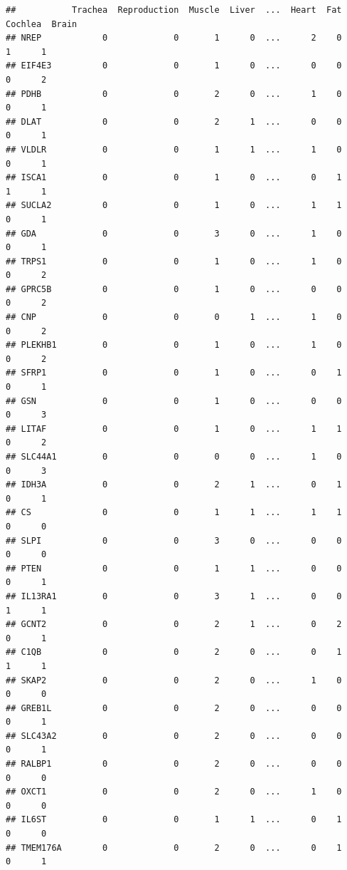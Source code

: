 \documentclass[
]{article}
\begin{document}
\begin{verbatim}
##           Trachea  Reproduction  Muscle  Liver  ...  Heart  Fat  Cochlea  Brain
## NREP            0             0       1      0  ...      2    0        1      1
## EIF4E3          0             0       1      0  ...      0    0        0      2
## PDHB            0             0       2      0  ...      1    0        0      1
## DLAT            0             0       2      1  ...      0    0        0      1
## VLDLR           0             0       1      1  ...      1    0        0      1
## ISCA1           0             0       1      0  ...      0    1        1      1
## SUCLA2          0             0       1      0  ...      1    1        0      1
## GDA             0             0       3      0  ...      1    0        0      1
## TRPS1           0             0       1      0  ...      1    0        0      2
## GPRC5B          0             0       1      0  ...      0    0        0      2
## CNP             0             0       0      1  ...      1    0        0      2
## PLEKHB1         0             0       1      0  ...      1    0        0      2
## SFRP1           0             0       1      0  ...      0    1        0      1
## GSN             0             0       1      0  ...      0    0        0      3
## LITAF           0             0       1      0  ...      1    1        0      2
## SLC44A1         0             0       0      0  ...      1    0        0      3
## IDH3A           0             0       2      1  ...      0    1        0      1
## CS              0             0       1      1  ...      1    1        0      0
## SLPI            0             0       3      0  ...      0    0        0      0
## PTEN            0             0       1      1  ...      0    0        0      1
## IL13RA1         0             0       3      1  ...      0    0        1      1
## GCNT2           0             0       2      1  ...      0    2        0      1
## C1QB            0             0       2      0  ...      0    1        1      1
## SKAP2           0             0       2      0  ...      1    0        0      0
## GREB1L          0             0       2      0  ...      0    0        0      1
## SLC43A2         0             0       2      0  ...      0    0        0      1
## RALBP1          0             0       2      0  ...      0    0        0      0
## OXCT1           0             0       2      0  ...      1    0        0      0
## IL6ST           0             0       1      1  ...      0    1        0      0
## TMEM176A        0             0       2      0  ...      0    1        0      1

\end{verbatim}
\end{document}
